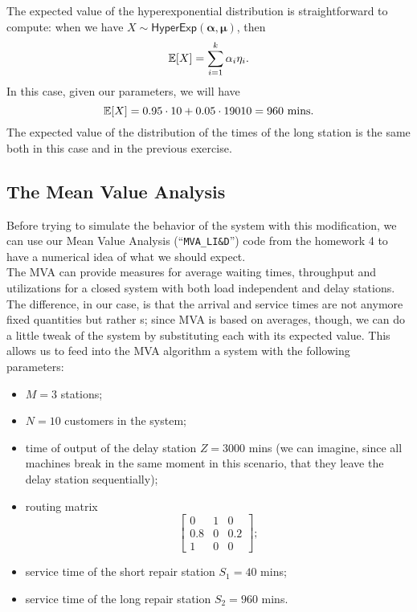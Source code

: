\documentclass[12pt]{article}
\begin{document}
The expected value of the hyperexponential distribution is straightforward to compute: when we have $X\sim\mathsf{HyperExp}(\mathbf{\alpha},\mathbf{\mu})$, then
\begin{equation*}
	\mathbb{E}[X]=\sum_{i=1}^{k}\alpha_i\eta_i.
\end{equation*}
In this case, given our parameters, we will have
\begin{equation*}
	\mathbb{E}[X]=0.95\cdot 10+0.05\cdot19010=960\text{ mins}.
\end{equation*}
The expected value of the distribution of the times of the long station is the same both in this case and in the previous exercise. \\
\subsection{The Mean Value Analysis}
Before trying to simulate the behavior of the system with this modification, we can use our Mean Value Analysis (``\verb*|MVA_LI&D|'') code from the homework 4 to have a numerical idea of what we should expect.\\
The MVA can provide measures for average waiting times, throughput and utilizations for a closed system with both load independent and delay stations. The difference, in our case, is that the arrival and service times are not anymore fixed quantities but rather \rv s; since MVA is based on averages, though, we can do a little tweak of the system by substituting each \rv{} with its expected value. This allows us to feed into the MVA algorithm a system with the following parameters:
\begin{itemize}
	\item $M=3$ stations;
	\item $N=10$ customers in the system;
	\item time of output of the delay station $Z=3000$ mins (we can imagine, since all machines break in the same moment in this scenario, that they leave the delay station sequentially);
	\item routing matrix
	\begin{equation*}
		\begin{bmatrix}
			0&1&0\\
			0.8&0&0.2\\
			1&0&0
		\end{bmatrix};
	\end{equation*}
	\item service time of the short repair station $S_1=40$ mins;
	\item service time of the long repair station $S_2=960$ mins.
\end{itemize}
\end{document}
